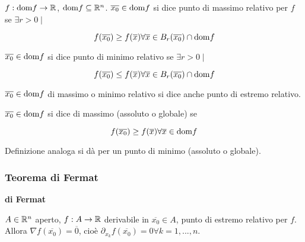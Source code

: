\begin{definition}
	$f:\mathrm{dom} f \rightarrow \mathbb{R}$, $\mathrm{dom} f \subseteq \mathbb{R}^n$. $\overline{x_0}\in \mathrm{dom} f$ si dice punto di massimo relativo per $f$ se $\exists r >0 \mid$
	
	$$ f(\overline{x_0})\geq f(\overline{x})\forall\overline{x}\in B_r(\overline{x_0})\cap \mathrm{dom} f$$
	
	$\overline{x_0}\in \mathrm{dom} f$ si dice punto di minimo relativo se $\exists r >0 \mid$
	 
	$$ f(\overline{x_0})\leq f(\overline{x})\forall \overline{x} \in B_r(\overline{x_0})\cap \mathrm{dom} f$$
	 
	$\overline{x_0} \in \mathrm{dom} f$ di massimo o minimo relativo si dice anche punto di estremo relativo.
	
	$\overline{x_0}\in \mathrm{dom} f$ si dice di massimo (assoluto o globale) se 
	
	$$f(\overline{x_0})\geq f(\overline{x})\forall \overline{x} \in \mathrm{dom} f$$
	
	Definizione analoga si dà per un punto di minimo (assoluto o globale).
\end{definition}


\subsubsection{Teorema di Fermat}
\begin{theorem} \textbf{di Fermat}
	
	\label{th: pag 366}
	$A \in \mathbb{R}^n$ aperto, $f: A \rightarrow \mathbb{R}$ derivabile in $\overline{x_0} \in A$, punto di estremo relativo per $f$. Allora $\nabla f(\overline{x_0})=\overline{0}$, cioè $\partial_{x_k}f(\overline{x_0})=0 \forall k =1,...,n$.
\end{theorem}


